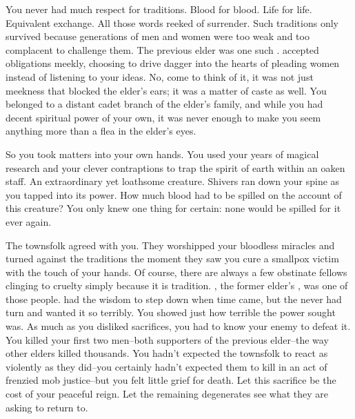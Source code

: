 \documentclass[char]{Pestilence}
\begin{document}
\name{\cElder{}}

You never had much respect for traditions. Blood for blood. Life for life. Equivalent exchange. All those words reeked of surrender. Such traditions only survived because generations of men and women were too weak and too complacent to challenge them. The previous elder was one such \cShaman{\human}. \cShaman{\They} accepted \cShaman{\their} obligations meekly, choosing to drive \cShaman{\their} dagger into the hearts of pleading women instead of listening to your ideas. No, come to think of it, it was not just meekness that blocked the elder's ears; it was a matter of caste as well. You belonged to a distant cadet branch of the elder's family, and while you had decent spiritual power of your own, it was never enough to make you seem anything more than a flea in the elder's eyes. 

So you took matters into your own hands. You used your years of magical research and your clever contraptions to trap the spirit of earth within an oaken staff. An extraordinary yet loathsome creature. Shivers ran down your spine as you tapped into its power. How much blood had to be spilled on the account of this creature? You only knew one thing for certain: none would be spilled for it ever again.

The townsfolk agreed with you. They worshipped your bloodless miracles and turned against the traditions the moment they saw you cure a smallpox victim with the touch of your hands. Of course, there are always a few obstinate fellows clinging to cruelty simply because it is tradition. \cPlaguebearer{}, the former elder's \cPlaguebearer{\offspring}, was one of those people. \cPlaguebearer{\Their} \cShaman{\parent} had the wisdom to step down when time came, but the \cPlaguebearer{\kid} never had \cPlaguebearer{\their} turn and \cPlaguebearer{\they} wanted it so terribly. You showed \cPlaguebearer{\them} just how terrible the power \cPlaguebearer{\they} sought was. As much as you disliked sacrifices, you had to know your enemy to defeat it. You killed your first two men--both supporters of the previous elder--the way other elders killed thousands. You hadn't expected the townsfolk to react as violently as they did--you certainly hadn't expected them to kill \cPlaguebearer{} in an act of frenzied mob justice--but you felt little grief for \cPlaguebearer{\their} death. Let this sacrifice be the cost of your peaceful reign. Let the remaining degenerates see what they are asking to return to.
\end{document}
